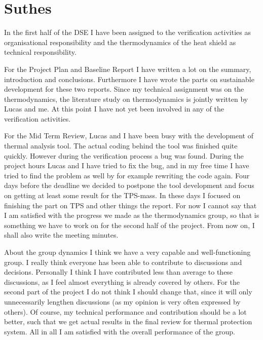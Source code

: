 \section{Suthes}

In the first half of the DSE I have been assigned to the verification activities as organisational responsibility and the thermodynamics of the heat shield as technical responsibility.

For the Project Plan and Baseline Report I have written a lot on the summary, introduction and conclusions. Furthermore I have wrote the parts on sustainable development for these two reports. Since my technical assignment was on the thermodynamics, the literature study on thermodynamics is jointly written by Lucas and me. At this point I have not yet been involved in any of the verification activities.

For the Mid Term Review, Lucas and I have been busy with the development of thermal analysis tool. The actual coding behind the tool was finished quite quickly. However during the verification process a bug was found. During the project hours Lucas and I have tried to fix the bug, and in my free time I have tried to find the problem as well by for example rewriting the code again. Four days before the deadline we decided to postpone the tool development and focus on getting at least some result for the TPS-mass. In these days I focused on finishing the part on TPS and other things the report. For now I cannot say that I am satisfied with the progress we made as the thermodynamics group, so that is something we have to work on for the second half of the project. From now on, I shall also write the meeting minutes.

About the group dynamics I think we have a very capable and well-functioning group. I really think everyone has been able to contribute to discussions and decisions. Personally I think I have contributed less than average to these discussions, as I feel almost everything is already covered by others. For the second part of the project I do not think I should change that, since it will only unnecessarily lengthen discussions (as my opinion is very often expressed by others). Of course, my technical performance and contribution should be a lot better, such that we get actual results in the final review for thermal protection system. All in all I am satisfied with the overall performance of the group.

